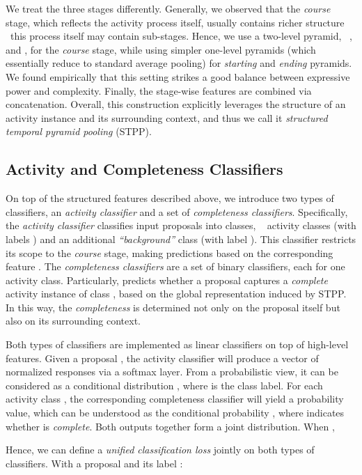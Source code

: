 \documentclass[10pt,twocolumn,letterpaper]{article}
\begin{document}
We treat the three stages differently.
Generally, we observed that the \emph{course} stage, which reflects
the activity process itself, usually contains richer structure
\eg~this process itself may contain sub-stages.
Hence, we use a two-level pyramid, \ie~, and , for the \emph{course}
stage, while using simpler one-level pyramids (which essentially
reduce to standard average pooling) for \emph{starting} and \emph{ending}
pyramids.
We found empirically that this setting strikes a good balance
between expressive power and complexity.
Finally, the stage-wise features are combined via concatenation.
Overall, this construction explicitly leverages the structure
of an activity instance and its surrounding context, and thus
we call it \emph{structured temporal pyramid pooling} (STPP).

\subsection{Activity and Completeness Classifiers}

On top of the structured features described above,
we introduce two types of classifiers, an \emph{activity classifier}
and a set of \emph{completeness classifiers}.
Specifically,
the \emph{activity classifier}  classifies input proposals
into  classes, \ie~ activity classes (with labels )
and an additional \emph{``background''} class (with label ).
This classifier restricts its scope to the \emph{course} stage,
making predictions based on the corresponding feature .
The \emph{completeness classifiers}  are a set of
binary classifiers, each for one activity class.
Particularly,  predicts whether a proposal captures a \emph{complete}
activity instance of class , based on the global representation  induced by STPP. In this way, the \emph{completeness}
is determined not only on the proposal itself but also on its
surrounding context.

Both types of classifiers are implemented as linear classifiers
on top of high-level features. Given a proposal ,
the activity classifier will produce
a vector of normalized responses via a softmax layer.
From a probabilistic view, it can be considered as a conditional
distribution , where  is the class label.
For each activity class , the corresponding completeness
classifier  will yield a probability value, which can
be understood as the conditional probability ,
where  indicates whether  is \emph{complete}.
Both outputs together form a joint distribution. When ,

Hence, we can define a \emph{unified classification loss}
jointly on both types of classifiers. With a proposal 
and its label :
\end{document}

